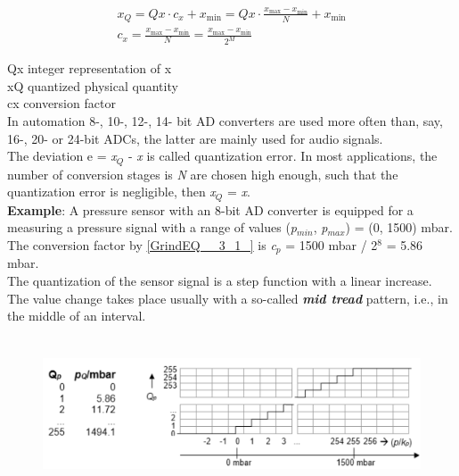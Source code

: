 \begin{equation}
	\begin{array}{l} {x_{Q} =Qx\cdot c_{x} +x_{\min } =Qx\cdot \frac{x_{\max } -x_{\min } }{N} +x_{\min } } \\
	
	 {c_{x} =\frac{x_{\max } -x_{\min } }{N} =\frac{x_{\max } -x_{\min } }{2^{M} } } \end{array}
\label{EQ }
\end{equation}

Qx	integer representation of x\\
xQ	quantized physical quantity\\
cx	conversion factor\\

In automation 8-, 10-, 12-, 14- bit AD converters are used more often than, say, 16-, 20- or 24-bit ADCs, the latter are mainly used for audio signals.\\

The deviation e = \textit{x${}_{Q}$} - \textit{x} is called quantization error. In most applications, the number of conversion stages is \textit{N} are chosen high enough, such that the quantization error is negligible, then \textit{x${}_{Q}$} = \textit{x}.\\

\textbf{Example}: A pressure sensor with an 8-bit AD converter is equipped for a measuring a pressure signal with a range of values (\textit{p${}_{min}$}, \textit{p${}_{max}$}) = (0, 1500) mbar.\\

The conversion factor by \eqref{GrindEQ__3_1_} is \textit{c${}_{p}$} = 1500 mbar / 2${}^{8}$ = 5.86 mbar.\\

The quantization of the sensor signal is a step function with a linear increase. The value change takes place usually with a so-called \textbf{\textit{mid tread}} pattern, i.e., in the middle of an interval.\\

    \begin{figure}[h]
    \centering
    \includegraphics[width=12cm, height=4.5cm]{Images/image141.png}
    \label{fig:Fig 93}
    \end{figure}

